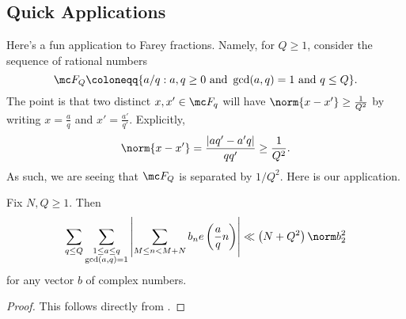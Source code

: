 \documentclass[../notes.tex]{subfiles}
\begin{document}
\subsection{Quick Applications}
Here's a fun application to Farey fractions. Namely, for $Q\ge1$, consider the sequence of rational numbers
\[\mc F_Q\coloneqq\{a/q:a,q\ge0\text{ and }\gcd(a,q)=1\text{ and }q\le Q\}.\]
The point is that two distinct $x,x'\in\mc F_q$ will have $\norm{x-x'}\ge\frac1{Q^2}$ by writing $x=\frac aq$ and $x'=\frac{a'}{q'}$. Explicitly,
\[\norm{x-x'}=\frac{|aq'-a'q|}{qq'}\ge\frac1{Q^2}.\]
As such, we are seeing that $\mc F_Q$ is separated by $1/Q^2$. Here is our application.
\begin{corollary} \label{cor:quick-large-sieve}
	Fix $N,Q\ge1$. Then
	\[\sum_{q\le Q}\sum_{\substack{1\le a\le q\\\gcd(a,q)=1}}\left|\sum_{M\le n<M+N}b_ne\left(\frac aqn\right)\right|\ll\left(N+Q^2\right)\norm b_2^2\]
	for any vector $b$ of complex numbers.
\end{corollary}
\begin{proof}
	This follows directly from .
\end{proof}
\end{document}
